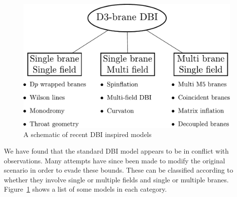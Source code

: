 \label{sec:others-dbi}
\begin{figure}[htb]
 \centering
 \includegraphics[keepaspectratio=true,
width=\textwidth]{./dbi/graphs/dbi-review.pdf}
 \caption{A schematic of recent DBI inspired models}
 \label{fig:review-dbi}
\end{figure}
% 

We have found that the standard DBI model appears to be in conflict with
observations. Many attempts have since been made to modify the original scenario in
order to evade these bounds. These can be classified according to
whether they involve single or multiple fields and single or multiple branes.
Figure~\ref{fig:review-dbi} shows a list of some models in
each category.


